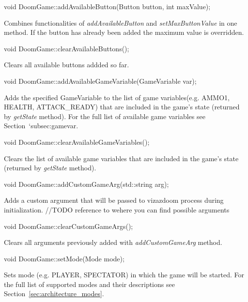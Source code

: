 \vspace{20pt}
\begin{clinee}
void DoomGame::addAvailableButton(Button button, int maxValue);
\end{clinee}
	Combines functionalities of \emph{addAvailableButton} and \emph{setMaxButtonValue} in one method. If the button has already been added the maximum value is overridden. 

\vspace{20pt}
\begin{clinee}
void DoomGame::clearAvailableButtons();
\end{clinee}
	Clears all available buttons addded so far.

\vspace{20pt}
\begin{clinee}
void DoomGame::addAvailableGameVariable(GameVariable var);
\end{clinee}
	Adds the specified GameVariable to the list of game variables(e.g. AMMO1, HEALTH, ATTACK\_READY) that are included in the game's state (returned by \emph{getState} method). For the full list of available game variables see Section~`{subsec:gamevar}.

\vspace{20pt}
\begin{clinee}
void DoomGame::clearAvailableGameVariables();
\end{clinee}
	Clears the list of available game variables that are included in the game's state (returned by \emph{getState} method).

\vspace{20pt}
\begin{clinee}
void DoomGame::addCustomGameArg(std::string arg);
\end{clinee}
	Adds a custom argument that will be passed to vizazdoom process during initialization. //TODO reference to wehere you can find possible arguments

\vspace{20pt}
\begin{clinee}
void DoomGame::clearCustomGameArgs();
\end{clinee}
	Clears all arguments previously added with \emph{addCustomGameArg} method.


\vspace{20pt}
\begin{clinee}
void DoomGame::setMode(Mode mode);
\end{clinee}
	Sets mode (e.g. PLAYER, SPECTATOR) in which the game will be started. For the full list of supported modes and their descriptions see Section~\ref{sec:architecture_modes}.

